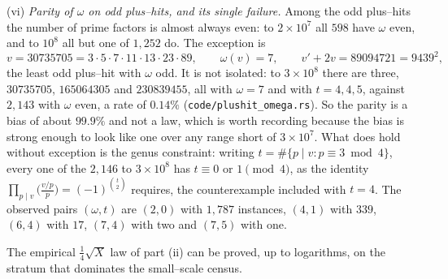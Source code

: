 \documentclass[11pt]{article}
\theoremstyle{definition}
\begin{document}
\textup{(vi)} \emph{Parity of $\omega$ on odd plus--hits, and its single failure.} Among the odd
plus--hits the number of prime factors is almost always even: to $2\times10^7$ all $598$ have
$\omega$ even, and to $10^8$ all but one of $1{,}252$ do. The exception is
\[ v=30735705=3\cdot5\cdot7\cdot11\cdot13\cdot23\cdot89,\qquad \omega(v)=7,\qquad
   v'+2v=89094721=9439^2, \]
the least odd plus--hit with $\omega$ odd. It is not isolated: to $3\times10^8$ there are three,
$30735705$, $165064305$ and $230839455$, all with $\omega=7$ and with $t=4,4,5$, against $2{,}143$
with $\omega$ even, a rate of $0.14\%$ \textup{(\texttt{code/plushit\_omega.rs})}. So the parity is a
bias of about $99.9\%$ and not a law,
which is worth recording because the bias is strong enough to look like one over any range short of
$3\times10^7$. What does hold without exception is the genus constraint: writing
$t=\#\{p\mid v:p\equiv3\bmod4\}$, every one of the $2{,}146$ to $3\times10^8$ has $t\equiv0$ or $1\pmod4$, as the
identity $\prod_{p\mid v}\bigl(\tfrac{v/p}p\bigr)=(-1)^{\binom t2}$ requires, the counterexample
included with $t=4$. The observed pairs $(\omega,t)$ are $(2,0)$ with $1{,}787$ instances, $(4,1)$ with $339$, $(6,4)$
with $17$, $(7,4)$ with two and $(7,5)$ with one.

The empirical $\tfrac14\sqrt X$ law of part (ii) can be proved, up to logarithms, on the stratum that
dominates the small--scale census.
\end{document}
